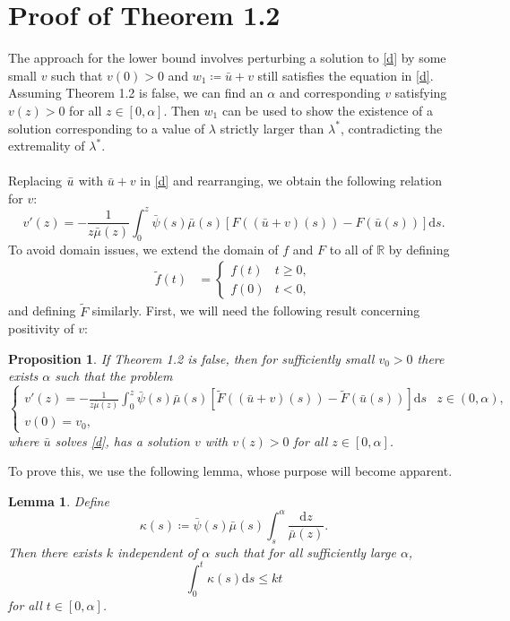 \documentclass{article}
\newtheorem{lem}[thm]{Lemma}
\newtheorem{prop}[thm]{Proposition}
\begin{document}
    \section{Proof of Theorem 1.2}
    The approach for the lower bound involves perturbing a solution to \eqref{d} by some small $v$ such that $v(0) > 0$ and $w_1\coloneqq \bar{u}+v$ still satisfies the equation in \eqref{d}. Assuming Theorem 1.2 is false, we can find an $\alpha$ and corresponding $v$ satisfying $v(z) > 0$ for all $z\in[0,\alpha]$. Then $w_1$ can be used to show the existence of a solution corresponding to a value of $\lambda$ strictly larger than $\lambda^*$, contradicting the extremality of $\lambda^*$. \\ \\ 
    Replacing $\Bar{u}$ with $\bar{u}+v$ in \eqref{d} and rearranging, we obtain the following relation for $v$:
    \begin{equation*}
        v'(z) = -\frac 1{z\bar \mu(z)}\int_0^z \bar\psi(s)\bar\mu(s)[F((\bar u+v)(s))-F(\bar u(s))]\mathrm{d}s.
    \end{equation*}
    To avoid domain issues, we extend the domain of $f$ and $F$ to all of $\mathbb R$ by defining
    \begin{align*}
        \tilde f(t) &= \begin{cases}f(t) & t\geq 0, \\ f(0) & t < 0,\end{cases}
    \end{align*}
    and defining $\widetilde F$ similarly. First, we will need the following result concerning positivity of $v$:
    \begin{prop}
        If Theorem 1.2 is false, then for sufficiently small $v_0>0$  there exists $\alpha$ such that the problem
        \begin{equation}\label{e}
        \begin{cases}v'(z) = -\frac 1{z\bar \mu(z)}\int_0^z \bar\psi(s)\bar\mu(s)[\widetilde F((\bar u+v)(s))-\widetilde F(\bar u(s))]\mathrm{d}s & z\in(0,\alpha), \\ v(0) = v_0, \end{cases}
        \end{equation}
        where $\bar{u}$ solves \eqref{d}, has a solution $v$ with $v(z) > 0$ for all $z\in[0,\alpha]$.
    \end{prop}
    To prove this, we use the following lemma, whose purpose will become apparent.
    \begin{lem}
    Define
    \[\kappa(s) \coloneqq \bar\psi(s)\bar\mu(s)\int_s^{\alpha}\frac{\mathrm{d}z}{\bar\mu(z)}.\]
    Then there exists $k$ independent of $\alpha$ such that for all sufficiently large $\alpha$,
    \[\int_0^t\kappa(s)\mathrm{d}s \leq kt\]
    for all $t\in[0,\alpha]$.
\end{lem}
\end{document}
